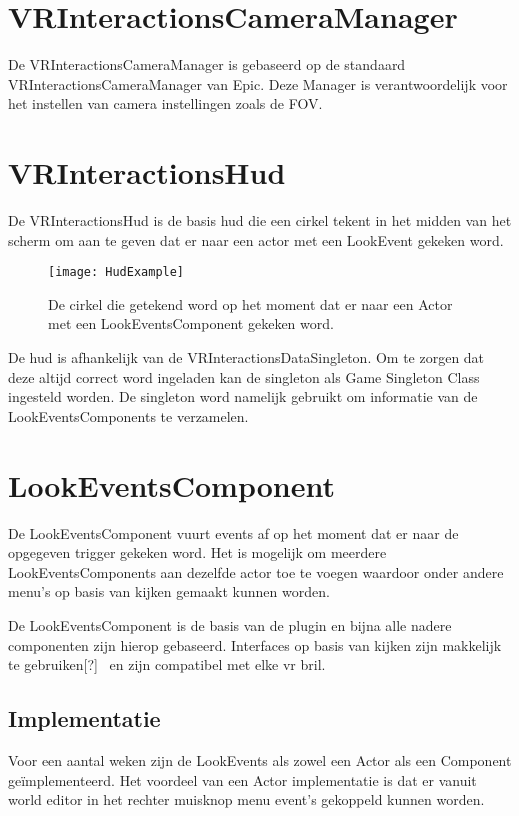 \section{VRInteractionsCameraManager}
De VRInteractionsCameraManager is gebaseerd op de standaard VRInteractionsCameraManager van Epic. Deze Manager is verantwoordelijk voor het instellen van camera instellingen zoals de FOV. 

\section{VRInteractionsHud}
De VRInteractionsHud is de basis \gls{hud} die een cirkel tekent in het midden van het scherm om aan te geven dat er naar een actor met een LookEvent gekeken word.

\begin{figure}[H]
  \centering
    \texttt{[image: HudExample]}
    \caption{De cirkel die getekend word op het moment dat er naar een Actor met een LookEventsComponent gekeken word.}
\end{figure}

De \gls{hud} is afhankelijk van de VRInteractionsDataSingleton. Om te zorgen dat deze altijd correct word ingeladen kan de singleton als Game Singleton Class ingesteld worden. De singleton word namelijk gebruikt om informatie van de LookEventsComponents te verzamelen.

\section{LookEventsComponent}
De LookEventsComponent vuurt events af op het moment dat er naar de opgegeven trigger gekeken word. Het is mogelijk om meerdere LookEventsComponents aan dezelfde actor toe te voegen waardoor onder andere menu's op basis van kijken gemaakt kunnen worden.

De LookEventsComponent is de basis van de plugin en bijna alle nadere componenten zijn hierop gebaseerd. Interfaces op basis van kijken zijn makkelijk te gebruiken[?]~ en zijn compatibel met elke \gls{vr} bril.


\subsection{Implementatie}
Voor een aantal weken zijn de LookEvents als zowel een Actor als een Component geïmplementeerd. Het voordeel van een Actor implementatie is dat er vanuit world editor in het rechter muisknop menu event's gekoppeld kunnen worden.

